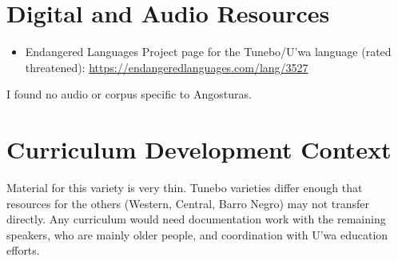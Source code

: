 \documentclass[12pt]{article}
\begin{document}
\section{Digital and Audio Resources}
\begin{itemize}
\item Endangered Languages Project page for the Tunebo/U'wa language (rated threatened): \url{https://endangeredlanguages.com/lang/3527}
\end{itemize}
I found no audio or corpus specific to Angosturas.

\section{Curriculum Development Context}
Material for this variety is very thin. Tunebo varieties differ enough that resources for the others (Western, Central, Barro Negro) may not transfer directly. Any curriculum would need documentation work with the remaining speakers, who are mainly older people, and coordination with U'wa education efforts.
\end{document}

